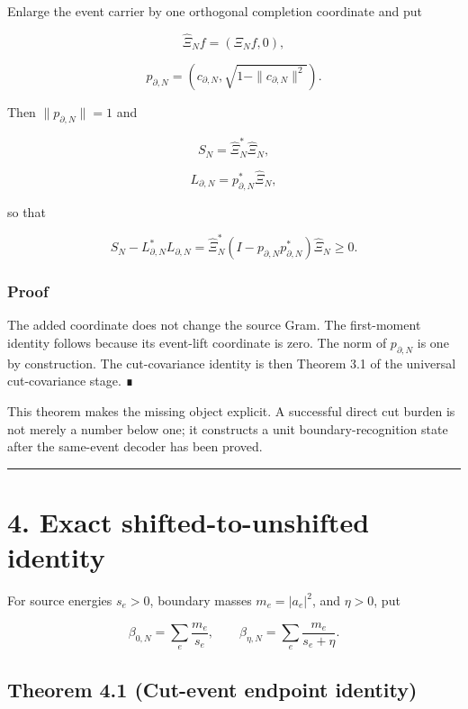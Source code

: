 Enlarge the event carrier by one orthogonal completion coordinate and put

\[
\widehat\Xi_N f=(\Xi_N f,0),
\]

\[
\boxed{
p_{\partial,N}
=\left(c_{\partial,N},
\sqrt{1-\|c_{\partial,N}\|^2}\right).
}
\]

Then \(\|p_{\partial,N}\|=1\) and

\[
\boxed{
S_N=\widehat\Xi_N^*\widehat\Xi_N,
}
\]

\[
\boxed{
L_{\partial,N}=p_{\partial,N}^*\widehat\Xi_N,
}
\]

so that

\[
\boxed{
S_N-L_{\partial,N}^*L_{\partial,N}
=\widehat\Xi_N^*
\left(I-p_{\partial,N}p_{\partial,N}^*\right)
\widehat\Xi_N
\ge0.
}
\]

\hypertarget{proof}{%
\subsubsection{Proof}\label{proof}}

The added coordinate does not change the source Gram. The first-moment identity
follows because its event-lift coordinate is zero. The norm of
\(p_{\partial,N}\) is one by construction. The cut-covariance identity is then
Theorem 3.1 of the universal cut-covariance stage. ∎

This theorem makes the missing object explicit. A successful direct cut burden
is not merely a number below one; it constructs a unit boundary-recognition
state after the same-event decoder has been proved.

\begin{center}\rule{0.5\linewidth}{0.5pt}\end{center}

\hypertarget{exact-shifted-to-unshifted-identity}{%
\section{4. Exact shifted-to-unshifted identity}\label{exact-shifted-to-unshifted-identity}}

For source energies \(s_e>0\), boundary masses \(m_e=|a_e|^2\), and \(\eta>0\),
put

\[
\beta_{0,N}=\sum_e\frac{m_e}{s_e},
\qquad
\beta_{\eta,N}=\sum_e\frac{m_e}{s_e+\eta}.
\]

\hypertarget{theorem-4.1-cut-event-endpoint-identity}{%
\subsection{Theorem 4.1 (Cut-event endpoint identity)}\label{theorem-4.1-cut-event-endpoint-identity}}

